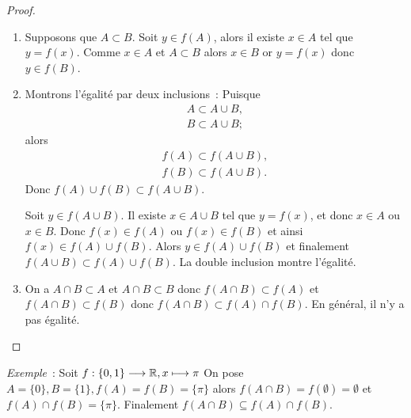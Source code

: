 \begin{proof}
    \begin{enumerate}
        \item Supposons que \(A \subset B\). Soit \(y \in f(A)\), alors il 
            existe \(x \in A\) tel que \(y=f(x)\). Comme \(x \in A\) et \(A 
            \subset B\) alors \(x \in B\) or \(y=f(x)\) donc \(y \in f(B)\).
        \item Montrons l'égalité par deux inclusions~: Puisque
            \begin{gather}
                A \subset A \cup B, \\
                B \subset A \cup B;
            \end{gather}
            alors
            \begin{gather}
                f(A) \subset f(A \cup B), \\
                f(B) \subset f(A \cup B).
            \end{gather}
            Donc \(f(A) \cup f(B) \subset f(A \cup B)\).

            Soit \(y \in f(A \cup B)\). Il existe \(x \in A \cup B\) tel que 
            \(y=f(x)\), et donc \(x \in A\) ou \(x \in B\). Donc \(f(x) \in 
            f(A)\) ou \(f(x) \in f(B)\) et ainsi \(f(x) \in f(A) \cup  f(B)\). 
            Alors \(y \in f(A) \cup f(B)\) et finalement \(f(A \cup B) \subset 
            f(A) \cup f(B)\). La double inclusion montre l'égalité.
        \item On a \(A \cap B \subset A\) et \(A \cap B \subset B\) donc \(f(A 
            \cap B) \subset f(A)\) et \(f(A \cap B) \subset f(B)\) donc \(f(A 
            \cap B) \subset f(A) \cap f(B)\). En général, il n'y a pas égalité.
    \end{enumerate}
\end{proof}
%
\emph{Exemple}~: Soit \(f:\{0,1\} \longrightarrow \mathbb{R}, x \longmapsto \pi\) On pose \(A=\{0\}, 
B=\{1\}, f(A)=f(B)=\{\pi\}\) alors \(f(A \cap B)=f(\emptyset)=\emptyset\) et 
\(f(A) \cap f(B)=\{\pi\}\). Finalement \(f(A \cap B) \subseteq f(A) \cap f(B)\).

